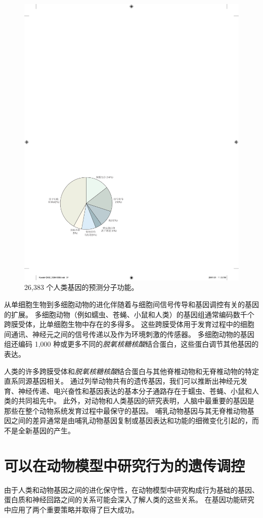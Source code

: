 \begin{figure}[htbp]
	\centering
	\includegraphics[width=0.55\linewidth]{chap02/fig_2_6}
	\caption{26,383 个人类基因的预测分子功能\cite{venter2001sequence}。}
	\label{fig:2_6}
\end{figure}


从单细胞生物到多细胞动物的进化伴随着与细胞间信号传导和基因调控有关的基因的扩展。
多细胞动物（例如蠕虫、苍蝇、小鼠和人类）的基因组通常编码数千个跨膜受体，比单细胞生物中存在的多得多。 
这些跨膜受体用于发育过程中的细胞间通讯、神经元之间的信号传递以及作为环境刺激的传感器。
多细胞动物的基因组还编码 1,000 种或更多不同的\textit{脱氧核糖核酸}结合蛋白，这些蛋白调节其他基因的表达。


人类的许多跨膜受体和\textit{脱氧核糖核酸}结合蛋白与其他脊椎动物和无脊椎动物的特定直系同源基因相关。
通过列举动物共有的遗传基因，我们可以推断出神经元发育、神经传递、电兴奋性和基因表达的基本分子通路存在于蠕虫、苍蝇、小鼠和人类的共同祖先中。
此外，对动物和人类基因的研究表明，人脑中最重要的基因是那些在整个动物系统发育过程中最保守的基因。
哺乳动物基因与其无脊椎动物基因之间的差异通常是由哺乳动物基因复制或基因表达和功能的细微变化引起的，而不是全新基因的产生。



\section{可以在动物模型中研究行为的遗传调控}

由于人类和动物基因之间的进化保守性，在动物模型中研究构成行为基础的基因、蛋白质和神经回路之间的关系可能会深入了解人类的这些关系。
在基因功能研究中应用了两个重要策略并取得了巨大成功。


